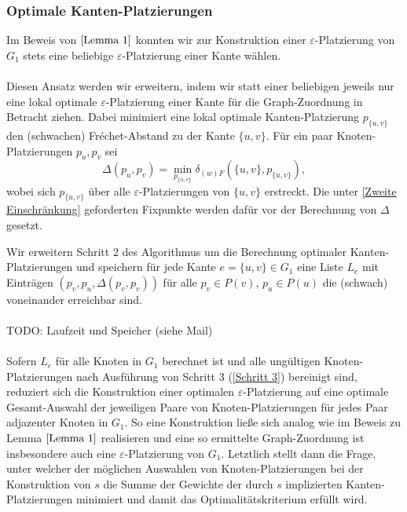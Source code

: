 \documentclass[a4paper, 12pt, twoside]{article}
\theoremstyle{Format1} %
\begin{document}
\subsubsection{Optimale Kanten-Platzierungen}
Im Beweis von $\ref{Lemma 1}$ konnten wir zur Konstruktion einer $\varepsilon$-Platzierung von $G_1$ stets eine beliebige $\varepsilon$-Platzierung einer Kante wählen.
\\
\\
Diesen Ansatz werden wir erweitern, indem wir statt einer beliebigen jeweils nur eine lokal optimale $\varepsilon$-Platzierung einer Kante für die Graph-Zuordnung in Betracht ziehen.
Dabei minimiert eine lokal optimale Kanten-Platzierung $p_{\{u,v\}}$ den (schwachen) Fréchet-Abstand zu der Kante $\{u,v\}$.
Für ein paar Knoten-Platzierungen $p_u, p_v$ sei $$\Delta(p_u,p_v) = \min_{p_{{\{u,v}\}}} \delta_{(w)F}(\{u,v\},p_{\{u,v\}}),$$ wobei sich $p_{{\{u,v}\}}$ über alle
$\varepsilon$-Platzierungen von $\{u,v\}$ erstreckt. Die unter \ref{Zweite Einschränkung} geforderten Fixpunkte werden dafür vor der Berechnung von $\Delta$ gesetzt.

Wir erweitern Schritt 2 des Algorithmus um die Berechnung optimaler Kanten-Platzierungen und speichern für jede Kante $e=\{u,v\} \in G_1$ eine Liste $L_e$
mit Einträgen $(p_v, p_u, \Delta(p_v,p_v))$ für alle $p_v \in P(v)$, $p_u \in P(u)$ die (schwach) voneinander erreichbar sind.
\\
\\
TODO: Laufzeit und Speicher (siehe Mail)
\\
\\
Sofern $L_e$ für alle Knoten in $G_1$ berechnet ist und alle ungültigen Knoten-Platzierungen nach Ausführung von Schritt 3 (\ref{Schritt 3}) bereinigt sind,
reduziert sich die Konstruktion einer optimalen $\varepsilon$-Platzierung auf eine optimale Gesamt-Auswahl der jeweiligen Paare von Knoten-Platzierungen für jedes Paar adjazenter Knoten in $G_1$.
So eine Konstruktion ließe sich analog wie im Beweis zu Lemma $\ref{Lemma 1}$ realisieren und eine so ermittelte Graph-Zuordnung ist insbesondere auch eine $\varepsilon$-Platzierung von $G_1$.
Letztlich stellt dann die Frage, unter welcher der möglichen Auswahlen von Knoten-Platzierungen bei der Konstruktion von $s$ die Summe der Gewichte der durch $s$ implizierten Kanten-Platzierungen
minimiert und damit das Optimalitätskriterium erfüllt wird.
\end{document}

